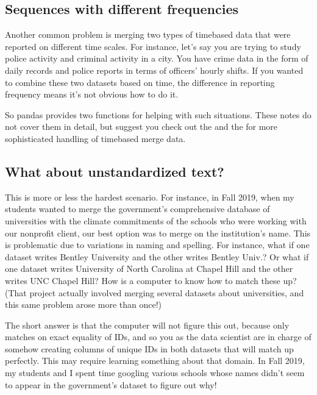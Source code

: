 \documentclass[letterpaper,10pt,english]{sphinxmanual}
\begin{document}
\subsection{Sequences with different frequencies}
\label{\detokenize{chapter-12-concat-and-merge:sequences-with-different-frequencies}}
Another common problem is merging two types of time\sphinxhyphen{}based data that were reported on different time scales.  For instance, let’s say you are trying to study police activity and criminal activity in a city.  You have crime data in the form of daily records and police reports in terms of officers’ hourly shifts.  If you wanted to combine these two datasets based on time, the difference in reporting frequency means it’s not obvious how to do it.

So pandas provides two functions for helping with such situations.  These notes do not cover them in detail, but suggest you check out the  and the  for more sophisticated handling of time\sphinxhyphen{}based merge data.


\subsection{What about unstandardized text?}
\label{\detokenize{chapter-12-concat-and-merge:what-about-unstandardized-text}}
This is more or less the hardest scenario.  For instance, in Fall 2019, when my students wanted to merge the government’s comprehensive database of universities with the climate commitments of the schools who were working with our nonprofit client, our best option was to merge on the institution’s name.  This is problematic due to variations in naming and spelling.  For instance, what if one dataset writes Bentley University and the other writes Bentley Univ.?  Or what if one dataset writes University of North Carolina at Chapel Hill and the other writes UNC Chapel Hill?  How is a computer to know how to match these up?  (That project actually involved merging several datasets about universities, and this same problem arose more than once!)

The short answer is that the computer will not figure this out, because  only matches on exact equality of IDs, and so you as the data scientist are in charge of somehow creating columns of unique IDs in both datasets that will match up perfectly.  This may require learning something about that domain.  In Fall 2019, my students and I spent time googling various schools whose names didn’t seem to appear in the government’s dataset to figure out why!
\end{document}

